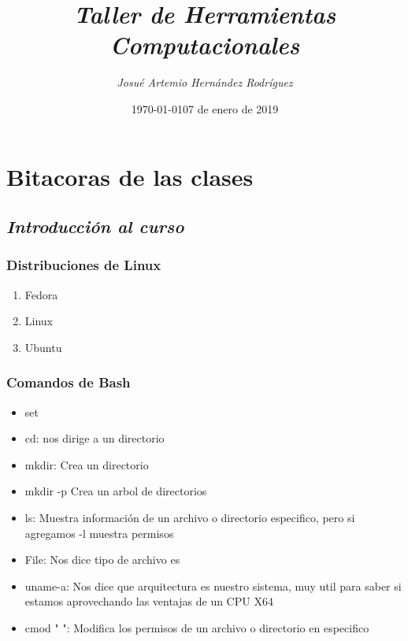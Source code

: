 \documentclass{book}
\title{\textit{Taller de Herramientas Computacionales}}
\author{\textit{Josué Artemio Hernández Rodríguez}}
\date{\today}
\begin{document}
\maketitle

\tableofcontents


	

\newpage

\chapter{Bitacoras de las clases}



\section{\textit{Introducción al curso}}%
\begin{flushright}
	\date{07 de enero de 2019}
\end{flushright}




	\subsection{Distribuciones de Linux} %
	\begin{enumerate}%
		\item Fedora
		\item Linux
		\item Ubuntu
	\end{enumerate}%
	\subsection{Comandos de Bash} %
	\begin{itemize}%
		\item set
		\item cd: nos dirige a un directorio
		\item mkdir: Crea un directorio
		\item mkdir -p Crea un arbol de directorios
		\item ls: Muestra información de un archivo o directorio especifico, pero si agregamos -l muestra permisos
		\item File: Nos dice tipo de archivo es
		\item uname-a: Nos dice que arquitectura es nuestro sistema, muy util para saber si estamos aprovechando las ventajas de un CPU X64
		\item cmod "   ": Modifica los permisos de un archivo o directorio en especifico
		
	\end{itemize}%
\end{document}
